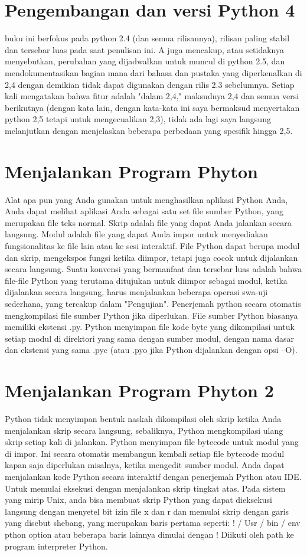 \documentclass[12pt, times new roman, a4paper]{article}
\begin{document}
\section{Pengembangan dan versi Python 4}
buku ini berfokus pada python 2.4 (dan semua rilisannya), rilisan paling stabil dan tersebar luas pada saat penulisan ini. A juga mencakup, atau setidaknya menyebutkan, perubahan yang dijadwalkan untuk muncul di python 2.5, dan mendokumentasikan bagian mana dari bahasa dan pustaka yang diperkenalkan di 2,4 dengan demikian tidak dapat digunakan dengan rilis 2.3 sebelumnya. Setiap kali mengatakan bahwa fitur adalah "dalam 2,4," maksudnya 2,4 dan semua versi berikutnya (dengan kata lain, dengan kata-kata ini saya bermaksud menyertakan python 2,5 tetapi untuk mengecualikan 2,3), tidak ada lagi saya langsung melanjutkan dengan menjelaskan beberapa perbedaan yang spesifik hingga 2,5.

\section{Menjalankan Program Phyton}
Alat apa pun yang Anda gunakan untuk menghasilkan aplikasi Python Anda, Anda dapat melihat aplikasi Anda sebagai satu set file sumber Python, yang merupakan file teks normal. Skrip adalah file yang dapat Anda jalankan secara langsung. Modul adalah file yang dapat Anda impor untuk menyediakan fungsionalitas ke file lain atau ke sesi interaktif. File Python dapat berupa modul dan skrip, mengekspos fungsi ketika diimpor, tetapi juga cocok untuk dijalankan secara langsung. Suatu konvensi yang bermanfaat dan tersebar luas adalah bahwa file-file Python yang terutama ditujukan untuk diimpor sebagai modul, ketika dijalankan secara langsung, harus menjalankan beberapa operasi swa-uji sederhana, yang tercakup dalam "Pengujian". Penerjemah python secara otomatis mengkompilasi file sumber Python jika diperlukan. File sumber Python biasanya memiliki ekstensi .py. Python menyimpan file kode byte yang dikompilasi untuk setiap modul di direktori yang sama dengan sumber modul, dengan nama dasar dan ekstensi yang sama .pyc (atau .pyo jika Python dijalankan dengan opsi –O).

\section{Menjalankan Program Phyton 2}
Python tidak menyimpan bentuk naskah dikompilasi oleh skrip ketika Anda menjalankan skrip secara langsung, sebaliknya, Python mengkompilasi ulang skrip setiap kali di jalankan. Python menyimpan file bytecode untuk modul yang di impor. Ini secara otomatis membangun kembali setiap file bytecode modul kapan saja diperlukan misalnya, ketika mengedit sumber modul. Anda dapat menjalankan kode Python secara interaktif dengan penerjemah Python atau IDE. Untuk memulai eksekusi dengan menjalankan skrip tingkat atas. Pada sistem yang mirip Unix, anda bisa membuat skrip Python yang dapat dieksekusi langsung dengan menyetel bit izin file x dan r dan memulai skrip dengan garis yang disebut shebang, yang merupakan baris pertama seperti: ! / Usr / bin / env pthon {option} atau beberapa baris lainnya dimulai dengan ! Diikuti oleh path ke program interpreter Python.
\end{document}

